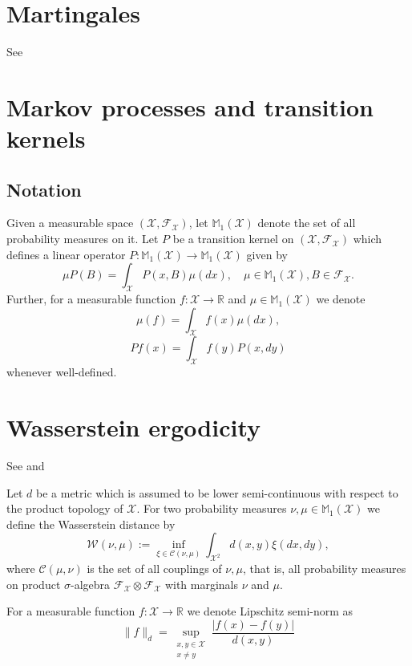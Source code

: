 
\section{Martingales}
See \cite{kallenberg2021foundations} 

\section{Markov processes and transition kernels}
\subsection*{Notation}

Given a measurable space $(\mathcal{X}, \mathcal{F}_{\mathcal{X}})$, let $\mathbb{M}_1(\mathcal{X})$ denote the set of all probability measures on it.
Let $P$ be a transition kernel on $(\mathcal{X}, \mathcal{F}_{\mathcal{X}})$ which defines a linear operator $P \colon \mathbb{M}_1(\mathcal{X}) \to \mathbb{M}_1(\mathcal{X})$ given by
\[
\mu P(B) = \int_{\mathcal{X}} P(x, B) \mu (dx) , \quad \mu \in \mathbb{M}_1(\mathcal{X}), B  \in  \mathcal{F}_{\mathcal{X}} .
\]
Further, for a measurable function $f \colon \mathcal{X} \to \mathbb{R}$ and $\mu \in \mathbb{M}_1(\mathcal{X})$ we denote 
\[
\mu(f) = \int_{\mathcal{X}} f(x) \mu(dx),
\]
\[ 
Pf(x) = \int_{\mathcal{X}} f(y) P(x, dy) 
\]
whenever well-defined.

\section{Wasserstein ergodicity}

See \cite{douc2018markov} and \cite{rudolf2017perturbationtheorymarkovchains}

Let $d$ be a metric 
which is assumed to be lower semi-continuous with respect to the product topology of $\mathcal{X}$. For two probability measures $\nu, \mu \in \mathbb{M}_1(\mathcal{X})$ we define the Wasserstein distance by
\[
\mathcal{W}(\nu, \mu):=\inf_{\xi \in \mathcal{C}(\nu, \mu)} \int_{\mathcal{X}^2} d(x,y) \xi(dx , dy) ,
\]
where $\mathcal{C}(\mu, \nu)$ is the set of all couplings of $\nu, \mu$, that is, all probability measures on product $\sigma$-algebra $\mathcal{F}_{\mathcal{X}} \otimes \mathcal{F}_{\mathcal{X}}$ with marginals $\nu$ and $\mu$.

For a measurable function $f \colon \mathcal{X} \to \mathbb{R}$ we denote Lipschitz semi-norm as
\[
\| f \|_d = \sup_{\substack{x, y \in \mathcal{X} \\ x \neq y}} \frac{\left\vert f(x) - f(y) \right\vert}{d(x, y)}
\]

